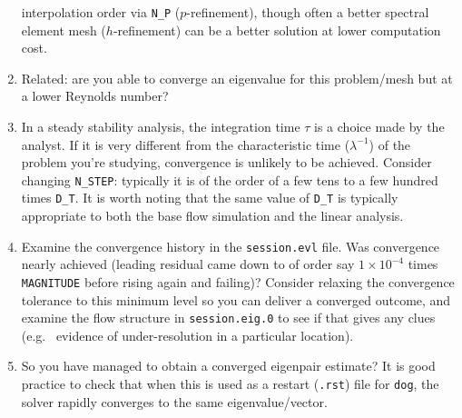 \documentclass[11pt,a4paper]{report}
\newcommand{\eg}{e.g.\ }
\begin{document}
\begin{enumerate}
interpolation order via \verb+N_P+ ($p$-refinement), though often a
better spectral element mesh ($h$-refinement) can be a better solution
at lower computation cost.
\item
Related: are you able to converge an eigenvalue for this problem/mesh
but at a lower Reynolds number?
\item
In a steady stability analysis, the integration time $\tau$ is a
choice made by the analyst.  If it is very different from the
characteristic time ($\lambda^{-1}$) of the problem you're studying,
convergence is unlikely to be achieved.  Consider changing
\verb+N_STEP+: typically it is of the order of a few tens to a few
hundred times \verb+D_T+. It is worth noting that the same value of
\verb+D_T+ is typically appropriate to both the base flow simulation
and the linear analysis.
\item
Examine the convergence history in the \verb+session.evl+ file.  Was
convergence nearly achieved (leading residual came down to of order
say $1\times10^{-4}$ times \verb+MAGNITUDE+ before rising again and
failing)?  Consider relaxing the convergence tolerance to this minimum
level so you can deliver a converged outcome, and examine the flow
structure in \verb+session.eig.0+ to see if that gives any clues (\eg
evidence of under-resolution in a particular location).
\item
So you have managed to obtain a converged eigenpair estimate?  It is
good practice to check that when this is used as a restart
(\verb+.rst+) file for \verb|dog|, the solver rapidly converges to the
same eigenvalue/vector.
\end{enumerate}




 

\end{document}
